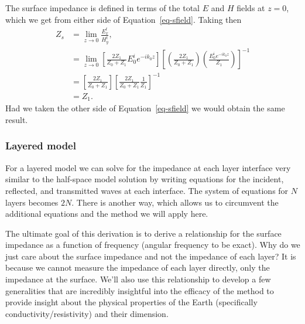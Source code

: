 The surface impedance is defined in terms of the total $E$ and $H$ fields at $z
= 0$, which we get from either side of Equation~\ref{eq-sfield}.  Taking then 
\begin{align*}
    Z_s & = \lim_{z \to 0} \frac{E^t_x}{H^t_y}, \\
        & = \lim_{z \to 0}
        \left[ \frac{2 Z_1}{Z_0 + Z_1} E^i_0 e^{-i k_0 z} \right]
        \left[ \left( \frac{2 Z_1}{Z_0 + Z_1} \right)
        \left( \frac{E^i_0 e^{-i k_0 z}}{Z_1} \right) \right]^{-1} \\
        & = \left[ \frac{2 Z_1}{Z_0 + Z_1} \right]
        \left[ \frac{2 Z_1}{Z_0 + Z_1} \frac{1}{Z_1} \right]^{-1} \\
        & = Z_1.
\end{align*}
Had we taken the other side of Equation~\ref{eq-sfield} we would obtain the same
result.

\subsubsection{Layered model}
For a layered model we can solve for the impedance at each layer interface very
similar to the half-space model solution by writing equations for the incident,
reflected, and transmitted waves at each interface.  The system of equations for
$N$ layers becomes $2N$.  There is another way, which allows us to circumvent
the additional equations and the method we will apply here.

The ultimate goal of this derivation is to derive a relationship for the surface
impedance as a function of frequency (angular frequency to be exact).  Why do we
just care about the surface impedance and not the impedance of each layer?  It
is because we cannot measure the impedance of each layer directly, only the
impedance at the surface.  We'll also use this relationship to develop a few
generalities that are incredibly insightful into the efficacy of the method to
provide insight about the physical properties of the Earth (specifically
conductivity/resistivity) and their dimension.

